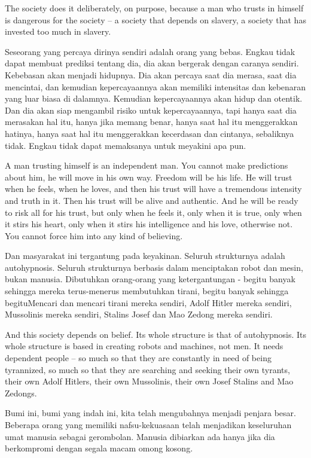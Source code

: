 \english
The society does it deliberately, on purpose, because a man who trusts in himself is dangerous for the society -- a society that depends on slavery, a society that has invested too much in slavery.

\bahasa
Seseorang yang percaya dirinya sendiri adalah orang yang bebas. Engkau tidak dapat membuat prediksi tentang dia, dia akan bergerak dengan caranya sendiri. Kebebasan akan menjadi hidupnya. Dia akan percaya saat dia merasa, saat dia mencintai, dan kemudian kepercayaannya akan memiliki intensitas dan kebenaran yang luar biasa di dalamnya. Kemudian kepercayaannya akan hidup dan otentik. Dan dia akan siap mengambil risiko untuk kepercayaannya, tapi hanya saat dia merasakan hal itu, hanya jika memang benar, hanya saat hal itu menggerakkan hatinya, hanya saat hal itu menggerakkan kecerdasan dan cintanya, sebaliknya tidak. Engkau tidak dapat memaksanya untuk meyakini apa pun.

\english
A man trusting himself is an independent man. You cannot make predictions about him, he will move in his own way. Freedom will be his life. He will trust when he feels, when he loves, and then his trust will have a tremendous intensity and truth in it. Then his trust will be alive and authentic. And he will be ready to risk all for his trust, but only when he feels it, only when it is true, only when it stirs his heart, only when it stirs his intelligence and his love, otherwise not. You cannot force him into any kind of believing.

\bahasa
Dan masyarakat ini tergantung pada keyakinan. Seluruh strukturnya adalah autohypnosis. Seluruh strukturnya berbasis dalam menciptakan robot dan mesin, bukan manusia. Dibutuhkan orang-orang yang ketergantungan - begitu banyak sehingga mereka terus-menerus membutuhkan tirani, begitu banyak sehingga begituMencari dan mencari tirani mereka sendiri, Adolf Hitler mereka sendiri, Mussolinis mereka sendiri, Stalins Josef dan Mao Zedong mereka sendiri.

\english
And this society depends on belief. Its whole structure is that of autohypnosis. Its whole structure is based in creating robots and machines, not men. It needs dependent people -- so much so that they are constantly in need of being tyrannized, so much so that they are searching and seeking their own tyrants, their own Adolf Hitlers, their own Mussolinis, their own Josef Stalins and Mao Zedongs.

\bahasa
Bumi ini, bumi yang indah ini, kita telah mengubahnya menjadi penjara besar. Beberapa orang yang memiliki nafsu-kekuasaan telah menjadikan keseluruhan umat manusia sebagai gerombolan. Manusia dibiarkan ada hanya jika dia berkompromi dengan segala macam omong kosong.

